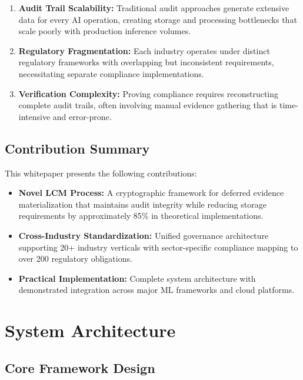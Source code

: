 \documentclass[12pt,a4paper]{article}
\begin{document}
\begin{enumerate}
\item \textbf{Audit Trail Scalability:} Traditional audit approaches generate extensive data for every AI operation, creating storage and processing bottlenecks that scale poorly with production inference volumes.

\item \textbf{Regulatory Fragmentation:} Each industry operates under distinct regulatory frameworks with overlapping but inconsistent requirements, necessitating separate compliance implementations.

\item \textbf{Verification Complexity:} Proving compliance requires reconstructing complete audit trails, often involving manual evidence gathering that is time-intensive and error-prone.
\end{enumerate}

\subsection{Contribution Summary}

This whitepaper presents the following contributions:

\begin{itemize}
\item \textbf{Novel LCM Process:} A cryptographic framework for deferred evidence materialization that maintains audit integrity while reducing storage requirements by approximately 85\% in theoretical implementations.

\item \textbf{Cross-Industry Standardization:} Unified governance architecture supporting 20+ industry verticals with sector-specific compliance mapping to over 200 regulatory obligations.

\item \textbf{Practical Implementation:} Complete system architecture with demonstrated integration across major ML frameworks and cloud platforms.
\end{itemize}

\section{System Architecture}

\subsection{Core Framework Design}
\end{document}
